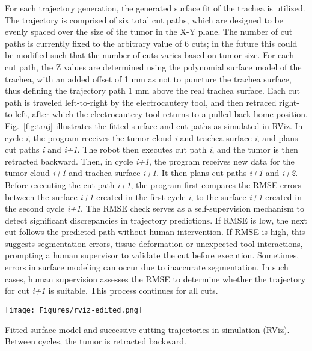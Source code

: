 For each trajectory generation, the generated surface fit of the trachea is utilized. The trajectory is comprised of six total cut paths, which are designed to be evenly spaced over the size of the tumor in the X-Y plane. The number of cut paths is currently fixed to the arbitrary value of 6 cuts; in the future this could be modified such that the number of cuts varies based on tumor size. For each cut path, the Z values are determined using the polynomial surface model of the trachea, with an added offset of 1 mm as not to puncture the trachea surface, thus defining the trajectory path 1 mm above the real trachea surface. Each cut path is traveled left-to-right by the electrocautery tool, and then retraced right-to-left, after which the electrocautery tool returns to a pulled-back home position. Fig.~\ref{fig:traj} illustrates the fitted surface and cut paths as simulated in RViz. In cycle \textit{i}, the program receives the tumor cloud \textit{i} and trachea surface \textit{i}, and plans cut paths \textit{i} and \textit{i+1}. The robot then executes cut path \textit{i}, and the tumor is then retracted backward. Then, in cycle \textit{i+1}, the program receives new data for the tumor cloud \textit{i+1} and trachea surface \textit{i+1}. It then plans cut paths \textit{i+1} and \textit{i+2}. Before executing the cut path \textit{i+1}, the program first compares the RMSE errors between the surface \textit{i+1} created in the first cycle \textit{i}, to the surface \textit{i+1} created in the second cycle \textit{i+1}. The RMSE check serves as a self-supervision mechanism to detect significant discrepancies in trajectory predictions. If RMSE is low, the next cut follows the predicted path without human intervention. If RMSE is high, this suggests segmentation errors, tissue deformation or unexpected tool interactions, prompting a human supervisor to validate the cut before execution. Sometimes, errors in surface modeling can occur due to inaccurate segmentation. In such cases, human supervision assesses the RMSE to determine whether the trajectory for cut \textit{i+1} is suitable. This process continues for all cuts.



\vspace{1em}
\begin{figurehere}
    \centering
    \texttt{[image: Figures/rviz-edited.png]}
    \caption{Fitted surface model and successive cutting trajectories in simulation (RViz). Between cycles, the tumor is retracted backward.}
    \label{fig:traj}
\end{figurehere}   